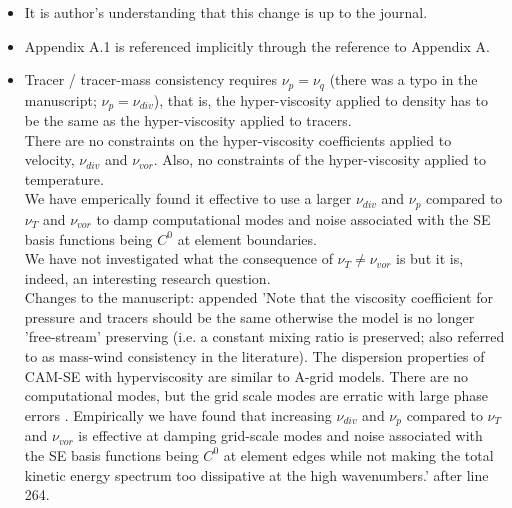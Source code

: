 \documentclass[11pt]{article}
\begin{document}
\begin{itemize}
\item {\color{blue}{L261: Numbering of appendices: currently the subsections of appendix A are numbered as A.1, A.2 and A.3. This numbering is also used for equations in Appendix A. Please use a different numbering of the appendix sections, e.g. A.a, A.b and A.c.}}

It is author's understanding that this change is up to the journal.

\item {\color{blue}{Please add a reference to Appendix A.1. I couldn't find any.}}

Appendix A.1 is referenced implicitly through the reference to Appendix A.

\item {}

Tracer / tracer-mass consistency requires $\nu_p = \nu_q$ (there was a typo in the manuscript; $\nu_p =\nu_{div}$), that is, the hyper-viscosity applied to density has to be the same as the hyper-viscosity applied to tracers.\\

There are no constraints on the hyper-viscosity coefficients applied to velocity, $\nu_{div}$ and $\nu_{vor}$.  Also, no constraints of the hyper-viscosity applied to temperature.\\

We have emperically found it effective to use a larger $\nu_{div}$ and $\nu_p$ compared to $\nu_T$ and $\nu_{vor}$ to damp computational modes and noise associated with the SE basis functions being $C^0$ at element boundaries.\\

We have not investigated what the consequence of  $\nu_T \neq \nu_{vor}$ is but it is, indeed, an interesting research question.\\

Changes to the manuscript: appended 'Note that the viscosity coefficient for pressure and tracers should be the same otherwise the model is no longer 'free-stream' preserving (i.e. a constant mixing ratio is preserved; also referred to as mass-wind consistency in the literature). The dispersion properties of CAM-SE with hyperviscosity are similar to A-grid models. There are no computational modes, but the grid scale modes are erratic with large phase errors \citep{AW2009SIAM}. Empirically we have found that increasing $\nu_{div}$ and $\nu_p$ compared to  $\nu_T$ and $\nu_{vor}$ is effective at damping grid-scale modes and noise associated with the SE basis functions being $C^0$ at element edges while not making the total kinetic energy spectrum too dissipative at the high wavenumbers.' after line 264.


\end{itemize}
\end{document}

